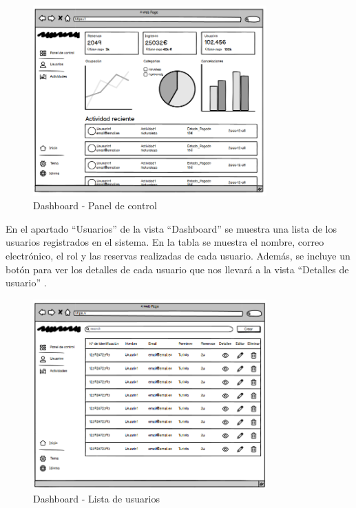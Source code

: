 \begin{figure}[H]
	\centering
	\includegraphics[width=0.8\textwidth]{5-AnalisisDelSistemaDeInformacion/InterfacesDeUsuario/Dashboard/panel de control.png}
	\caption{Dashboard - Panel de control}
\end{figure}


En el apartado “Usuarios” de la vista “Dashboard” se muestra una lista de los usuarios registrados en el sistema.
En la tabla se muestra el nombre, correo electrónico, el rol y las reservas realizadas de cada usuario.
Además, se incluye un botón para ver los detalles de cada usuario que nos llevará a la vista “Detalles de usuario” .

\begin{figure}[H]
	\centering
	\includegraphics[width=0.8\textwidth]{5-AnalisisDelSistemaDeInformacion/InterfacesDeUsuario/Dashboard/lista usuarios.png}
	\caption{Dashboard - Lista de usuarios}
\end{figure}

